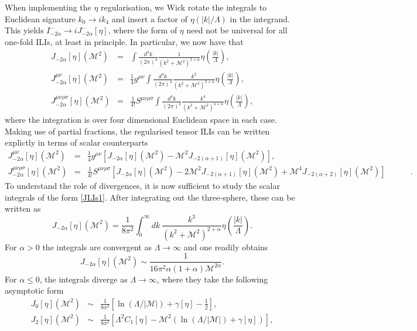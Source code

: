 \documentclass[12pt, letter]{article}
\def\be{\begin{equation}}
\def\ee{\end{equation}}
\newcommand{\M}{\mathcal{M}}
\begin{document}
When implementing the $\eta$ regularisation, we  Wick rotate the integrals to Euclidean signature $k_0 \to i k_4$ and insert a factor of $\eta(|k|/\Lambda)$ in the integrand. This yields $I_{-2 \alpha }^{\cdots }\to iJ_{-2\alpha}^{\cdots}[\eta]$, where the form of $\eta$ need not be universal for all one-fold ILIs, at least in principle. In particular, we now have that
\begin{eqnarray}
J_{-2\alpha}[\eta] (\M^2) &=& \int \frac{d^4 k}{(2 \pi)^4} \frac{1}{(k^2 +\M^2)^{2 + \alpha}}\eta\left(\frac{|k|}{\Lambda}\right), \label{JLIs1} \\
J_{-2 \alpha}^{ \mu \nu}[\eta](\M^2) &=& \frac14 g^{\mu\nu}  \int \frac{d^4 k}{(2 \pi)^4}  \frac{k^2}{(k^2 +\M^2)^{3+\alpha}}\eta\left(\frac{|k|}{\Lambda}\right)   \label{JLIs2}, \\
J_{-2 \alpha}^{\mu \nu \rho \sigma }[\eta] (\M^2) &=&  \frac{1}{4!} S^{\mu\nu \rho\sigma}  \int \frac{d^4 k}{(2 \pi)^4}  \frac{k^4}{(k^2 +\M^2)^{4+\alpha}}\eta\left(\frac{|k|}{\Lambda}\right), \label{JLIs3}
\end{eqnarray}
where the integration is over four dimensional Euclidean space in each case. Making use of  partial fractions, the regularised tensor ILIs can be written explictly in terms of scalar counterparts  
 \begin{eqnarray}
 J_{-2 \alpha}^{ \mu \nu}[\eta](\M^2)  & =&\frac14 g^{\mu\nu}\left[J_{-2\alpha}[\eta] (\M^2)-\M^2 J_{-2(\alpha+1)}[\eta] (\M^2)\right], \label{decomp1} \\
 J_{-2 \alpha}^{\mu \nu \rho \sigma }[\eta] (\M^2)  &=&\frac{1}{4!} S^{\mu\nu \rho\sigma} \left[J_{-2\alpha}[\eta] (\M^2)-2\M^2 J_{-2(\alpha+1)}[\eta] (\M^2) +\M^4 J_{-2(\alpha+2)}[\eta] (\M^2)  \right] \qquad \quad \label{decomp2}.
 \end{eqnarray}
To understand the role of divergences, it is now sufficient to study the scalar integrals of the form \eqref{JLIs1}.  After integrating out the three-sphere, these can be written as
\be
J_{-2\alpha}[\eta] (\M^2)=\frac{1}{8 \pi^2} \int_0^\infty  dk \ \frac{k^3}{(k^2+\M^2)^{2+\alpha}}  \eta\left(\frac{|k|}{\Lambda}\right).
\ee
For $\alpha>0$ the integrals are convergent as $\Lambda \to \infty$ and one readily obtains
\be
J_{-2\alpha}[\eta] (\M^2) \sim \frac{1}{16 \pi^2 \alpha (1+\alpha)\M^{2\alpha}}. \label{ascon}
\ee
For $\alpha \leq 0$, the integrals diverge as  $\Lambda \to \infty$, where they take the following asymptotic form
\begin{eqnarray}
J_{0}[\eta] (\M^2) &\sim& \frac{1}{8 \pi^2} \left[ \ln (\Lambda/|\M|) +\gamma[\eta] -\frac12 \right], \label{as0} \\
J_{2}[\eta] (\M^2) &\sim& \frac{1}{8 \pi^2} \left[ \Lambda^2 C_{1}[\eta]-\M^2\left(  \ln (\Lambda/|\M|) +\gamma[\eta]\right) \right], \label{as2}
\end{eqnarray}
\end{document}
